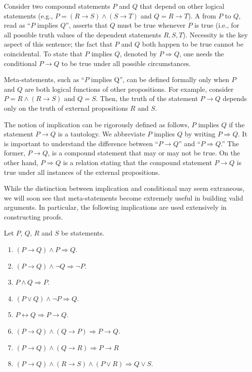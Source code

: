 Consider two compound statements $P$ and $Q$ that depend on other logical statements (e.g., $P = (R \to S) \wedge (S \to T)$ and $Q = R \to T$).
A  from $P$ to $Q$, read as ``$P$ implies $Q$'', asserts that $Q$ must be true whenever $P$ is true (i.e., for all possible truth values of the dependent statements $R,S,T$).
Necessity is the key aspect of this sentence; the fact that $P$ and $Q$ both happen to be true cannot be coincidental.
To state that $P$ implies $Q$, denoted by $P \Rightarrow Q$, one needs the conditional $P \rightarrow Q$ to be true under all possible circumstances.

Meta-statements, such as ``$P$ implies Q'', can be defined formally only when $P$ and $Q$ are both logical functions of other propositions.
For example, consider $P=R \wedge (R \to S)$ and $Q=S$.
Then, the truth of the statement $P \to Q$ depends only on the truth of external propositions $R$ and $S$.

The notion of implication can be rigorously defined as follows, $P$ implies $Q$ if the statement $P \rightarrow Q$ is a tautology.
We abbreviate $P$ implies $Q$ by writing $P \Rightarrow Q$.
It is important to understand the difference between ``$P \rightarrow Q$'' and ``$P \Rightarrow Q$.''
The former, $P \rightarrow Q$, is a compound statement that may or may not be true.
On the other hand, $P \Rightarrow Q$ is a relation stating that the compound statement $P \rightarrow Q$ is true under all instances of the external propositions.

While the distinction between implication and conditional may seem extraneous, we will soon see that meta-statements become extremely useful in building valid arguments.
In particular, the following implications are used extensively in constructing proofs.
\begin{fact}
Let $P$, $Q$, $R$ and $S$ be statements.
\begin{enumerate}
\item $(P \rightarrow Q) \wedge P \Rightarrow Q$.
\item $(P \rightarrow Q) \wedge \neg Q \Rightarrow \neg P$.
\item $P \wedge Q \Rightarrow P$.
\item $(P \vee Q) \wedge \neg P \Rightarrow Q$.
\item $P \leftrightarrow Q \Rightarrow P \rightarrow Q$.
\item $(P \rightarrow Q) \wedge (Q \rightarrow P) \Rightarrow P \rightarrow Q$.
\item $(P \rightarrow Q) \wedge (Q \rightarrow R) \Rightarrow P \rightarrow R$
\item $(P \rightarrow Q) \wedge (R \rightarrow S) \wedge (P \vee R) \Rightarrow Q \vee S$.
\end{enumerate}
\end{fact}

